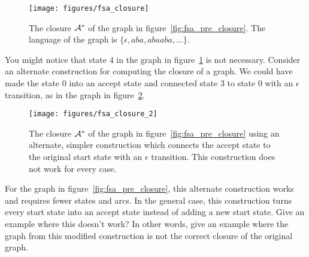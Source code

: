 \begin{figure}
    \centering
    \texttt{[image: figures/fsa\_closure]}
    \caption{The closure $\mathcal{A}^*$ of the graph in
    figure~\ref{fig:fsa_pre_closure}. The language of the graph is $\{\epsilon,
    aba, abaaba, \ldots\}$.}
    \label{fig:fsa_closure}
\end{figure}

\begin{example}
You might notice that state $4$ in the graph in figure~\ref{fig:fsa_closure} is
not necessary. Consider an alternate construction for computing the
closure of a graph. We could have made the state $0$ into an accept state
and connected state $3$ to state $0$ with an $\epsilon$ transition, as in
the graph in figure~\ref{fig:fsa_closure_2}.

\begin{figure}
    \centering
    \texttt{[image: figures/fsa\_closure\_2]}
    \caption{The closure $\mathcal{A}^*$ of the graph in
    figure~\ref{fig:fsa_pre_closure} using an alternate, simpler construction
    which connects the accept state to the original start state with an
    $\epsilon$ transition. This construction does not work for every case.}
    \label{fig:fsa_closure_2}
\end{figure}

For the graph in figure~\ref{fig:fsa_pre_closure}, this alternate construction
works and requires fewer states and arcs. In the general case, this
construction turns every start state into an accept state instead of adding
a new start state. Give an example where this doesn't work? In other words,
give an example where the graph from this modified construction is not the
correct closure of the original graph.
\end{example}

